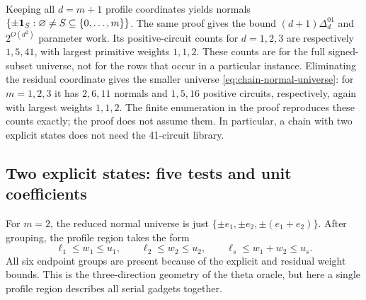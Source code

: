 \begin{remark}\label{rem:unreduced-chain}
Keeping all $d=m+1$ profile coordinates yields normals
$\{\pm\mathbf 1_S:\varnothing\ne S\subseteq\{0,\ldots,m\}\}$.
The same proof gives the bound $(d+1)\Delta^{01}_d$ and
$2^{O(d^2)}$ parameter work. Its positive-circuit counts for
$d=1,2,3$ are respectively $1,5,41$, with largest primitive
weights $1,1,2$. These counts are for the full signed-subset universe,
not for the rows that occur in a particular instance. Eliminating the
residual coordinate gives the smaller universe
\eqref{eq:chain-normal-universe}: for $m=1,2,3$ it has $2,6,11$
normals and $1,5,16$ positive circuits, respectively, again with
largest weights $1,1,2$. The finite enumeration in the proof reproduces
these counts exactly; the proof does not assume them. In particular,
a chain with two explicit states does not need the 41-circuit library.
\end{remark}

\subsection{Two explicit states: five tests and unit coefficients}

For $m=2$, the reduced normal universe is just
$\{\pm e_1,\pm e_2,\pm(e_1+e_2)\}$. After grouping, the
profile region takes the form
\begin{equation}\label{eq:chain-hexagon}
 \ell_1\le w_1\le u_1,\qquad
 \ell_2\le w_2\le u_2,\qquad
 \ell_s\le w_1+w_2\le u_s.
\end{equation}
All six endpoint groups are present because of the explicit and
residual weight bounds. This is the three-direction geometry of the
theta oracle, but here a single profile region describes all serial
gadgets together.

